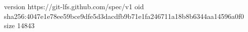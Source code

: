 version https://git-lfs.github.com/spec/v1
oid sha256:4047e1e78ee59bce9dfe5d3dacdfb9b71e1fa246711a18b8b6344aa14596a0f0
size 14843
